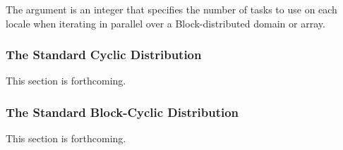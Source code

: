 The argument  is an integer that specifies the
number of tasks to use on each locale when iterating in parallel over
a Block-distributed domain or array.

\subsubsection{The Standard Cyclic Distribution}
\label{Cyclic_Dist}

This section is forthcoming.

\subsubsection{The Standard Block-Cyclic Distribution}
\label{Block_Cyclic_Dist}

This section is forthcoming.
